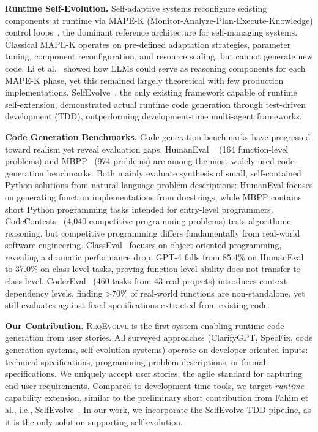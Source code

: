 \documentclass[sigconf,screen]{acmart}
\begin{document}
\textbf{Runtime Self-Evolution.} Self-adaptive systems reconfigure existing components at runtime via MAPE-K (Monitor-Analyze-Plan-Execute-Knowledge) control loops~\cite{mape-k,seams2020}, the dominant reference architecture for self-managing systems. Classical MAPE-K operates on pre-defined adaptation strategies, parameter tuning, component reconfiguration, and resource scaling, but cannot generate new code. Li et al.~\cite{li2024genaisas} showed how LLMs could serve as reasoning components for each MAPE-K phase, yet this remained largely theoretical with few production implementations. SelfEvolve~\cite{fahim2026selfevolve}, the only existing framework capable of runtime self-extension, demonstrated actual runtime code generation through test-driven development (TDD), outperforming development-time multi-agent frameworks.

\textbf{Code Generation Benchmarks.} Code generation benchmarks have progressed toward realism yet reveal evaluation gaps. HumanEval ~\cite{humaneval} (164 function-level problems) and MBPP~\cite{mbpp} (974 problems) are among the most widely used code generation benchmarks. Both mainly evaluate synthesis of small, self-contained Python solutions from natural-language problem descriptions: HumanEval focuses on generating function implementations from docstrings, while MBPP contains short Python programming tasks intended for entry-level programmers.
CodeContests~\cite{codecontests} (4,040 competitive programming problems) tests algorithmic reasoning, but competitive programming differs fundamentally from real-world software engineering. ClassEval~\cite{du2024evaluating} focuses on object oriented programming, revealing a dramatic performance drop: GPT-4 falls from 85.4\% on HumanEval to 37.0\% on class-level tasks, proving function-level ability does not transfer to class-level. CoderEval~\cite{yu2024codereval} (460 tasks from 43 real projects) introduces context dependency levels, finding >70\% of real-world functions are non-standalone, yet still evaluates against fixed specifications extracted from existing code.

\textbf{Our Contribution.} \textsc{ReqEvolve} is the first system enabling runtime code generation from user stories. All surveyed approaches (ClarifyGPT, SpecFix, code generation systems, self-evolution systems) operate on developer-oriented inputs: technical specifications, programming problem descriptions, or formal specifications. We uniquely accept user stories, the agile standard for capturing end-user requirements.  Compared to development-time tools, we target \textit{runtime} capability extension, similar to the preliminary short contribution from Fahim et al., i.e., SelfEvolve~\cite{fahim2026selfevolve}.
In our work, we incorporate the SelfEvolve TDD pipeline, as it is the only solution supporting self-evolution.
\end{document}
